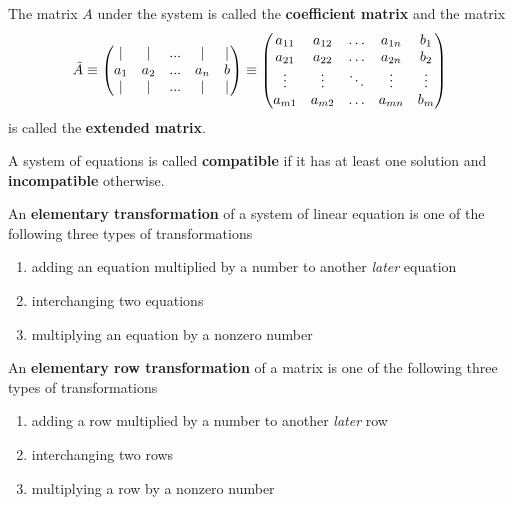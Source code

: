   \begin{definition}
    The matrix $A$ under the system is called the \textbf{coefficient matrix} and the matrix 
    \begin{equation}
      \Tilde{A} \equiv \begin{pmatrix}
      | & | & ... & | & | \\
      a_1 & a_2 & ... & a_n & b \\
      | & | & ... & | & | 
      \end{pmatrix} \equiv \begin{pmatrix}
      a_{1 1} & a_{1 2} & \ldots& a_{1 n} & b_1\\
       a_{2 1} & a_{2 2} & \ldots & a_{2 n} & b_2\\
      \vdots & \vdots & \ddots & \vdots & \vdots\\
       a_{m 1} & a_{m 2} & \ldots & a_{m n} & b_m
      \end{pmatrix}
    \end{equation}
    is called the \textbf{extended matrix}. 
  \end{definition}

  \begin{definition}
    A system of equations is called \textbf{compatible} if it has at least one solution and \textbf{incompatible} otherwise. 
  \end{definition}

  \begin{definition}
    An \textbf{elementary transformation} of a system of linear equation is one of the following three types of transformations
    \begin{enumerate}
      \item adding an equation multiplied by a number to another \textit{later} equation
      \item interchanging two equations
      \item multiplying an equation by a nonzero number
    \end{enumerate}
  \end{definition}

  \begin{definition}
    An \textbf{elementary row transformation} of a matrix is one of the following three types of transformations
    \begin{enumerate}
      \item adding a row multiplied by a number to another \textit{later} row
      \item interchanging two rows
      \item multiplying a row by a nonzero number
    \end{enumerate}
  \end{definition}

